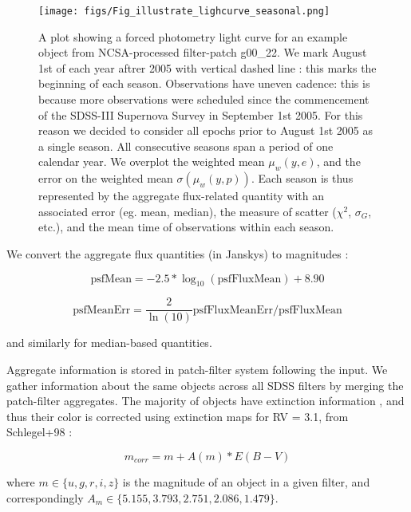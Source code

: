 \documentclass[fleqn,usenatbib]{mnras}  %
\begin{document}
\begin{figure}
 \texttt{[image: figs/Fig\_illustrate\_lighcurve\_seasonal.png]}
 \caption{A plot showing a forced photometry  light curve for an example object from NCSA-processed filter-patch  g00\_22.  We mark August 1st of each year aftrer 2005 with vertical dashed line : this marks the beginning of each season. Observations have uneven cadence:  this is because more observations were scheduled since the commencement of the SDSS-III Supernova Survey in September 1st 2005.   For this reason we decided to consider all epochs prior to August 1st 2005 as a single season.  All consecutive seasons span a period of one calendar year.  We overplot the weighted mean $\mu_{w}(y,e)$, and the error on the weighted mean $\sigma(\mu_{w}(y,p))$. Each season is thus represented by the aggregate flux-related quantity with an associated error (eg. mean, median),  the measure of scatter ($\chi^{2}$, $\sigma_{G}$, etc.), and the mean time of observations within each season.   }
 \label{fig:lc_example}
\end{figure}


We convert  the aggregate flux quantities (in Janskys) to magnitudes :

\begin{equation}
\mathrm{psfMean} = -2.5 * \log_{10}(\mathrm{psfFluxMean}) + 8.90  
\end{equation}

\begin{equation}
\mathrm{psfMeanErr} = \frac{2}{\ln(10)} \mathrm{psfFluxMeanErr} / \mathrm{psfFluxMean}
\end{equation}

and similarly for median-based quantities. 

Aggregate information is stored in patch-filter system  following the input.  We gather information about the same objects across all SDSS filters by merging the patch-filter aggregates.  The majority of objects have extinction information , and thus their color is corrected using extinction maps for RV = 3.1,  from Schlegel+98 : 

\begin{equation}
m_{corr} = m + A(m) * E(B-V)
\end{equation}

where $m \in \{ u,g,r,i,z \}$ is the magnitude of an object in a given filter, and correspondingly $A_{m} \in \{ 5.155, 3.793, 2.751, 2.086, 1.479 \}$. 
\end{document}

